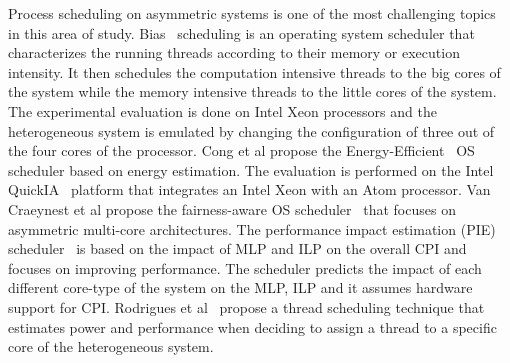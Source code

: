 Process scheduling on asymmetric systems is one of the most challenging topics in this area of study.
Bias~\cite{Koufaty_bias} scheduling is an operating system scheduler that characterizes the running threads according to their memory or execution intensity. 
It then schedules the computation intensive threads to the big cores of the system while the memory intensive threads to the little cores of the system.
The experimental evaluation is done on Intel Xeon processors and the heterogeneous system is emulated by changing the configuration of three out of the four cores of the processor.
Cong et al propose the Energy-Efficient~\cite{Cong_quickIA} OS scheduler based on energy estimation. The evaluation is performed on the Intel QuickIA~\cite{quickIA} platform that integrates an Intel Xeon with an Atom processor. 
Van Craeynest et al propose the fairness-aware OS scheduler~\cite{VanCraeynest_fairness} that focuses on asymmetric multi-core architectures. 
The performance impact estimation (PIE) scheduler~\cite{VanCraeynest_PIE} is based on the impact of MLP and ILP on the overall CPI and focuses on improving performance.
The scheduler predicts the impact of each different core-type of the system on the MLP, ILP and it assumes hardware support for CPI. 
Rodrigues et al~\cite{Rodrigues_thread_scheduling} propose a thread scheduling technique that estimates power and performance when deciding to assign a thread to a specific core of the heterogeneous system. 





